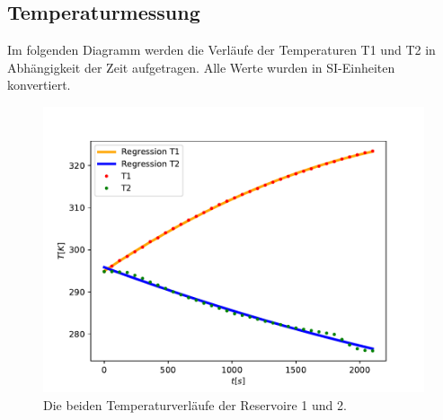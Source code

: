 \documentclass{scrartcl} %
\begin{document}
  \subsection{Temperaturmessung}
    Im folgenden Diagramm werden die Verläufe der Temperaturen T1 und T2 in Abhängigkeit der Zeit aufgetragen.
    Alle Werte wurden in SI-Einheiten konvertiert.
    \begin{figure}
      \centering
      \includegraphics[scale = 0.75]{Temperaturverlaeufe.pdf}
      \caption{Die beiden Temperaturverläufe der Reservoire 1 und 2.}
      \label{fig:TemperaturverlaufA}
    \end{figure}
\end{document}
